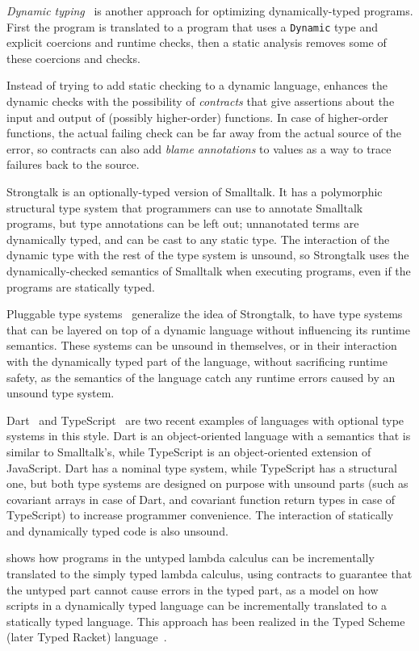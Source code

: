 \documentclass[preprint]{sig-alternate}
\begin{document}
\textit{Dynamic typing}~\citep{henglein1994dts} is
another approach for optimizing dynamically-typed programs.
First the program is translated to a program that uses
a {\tt Dynamic} type and explicit coercions and runtime checks,
then a static analysis removes some  of these coercions and
checks.

Instead of trying to add static checking to a dynamic
language, \citet{findler2002chf} enhances
the dynamic checks with the possibility of {\em contracts}
that give assertions about the input and output of (possibly
higher-order) functions. In case of higher-order functions,
the actual failing check can be far away from the actual
source of the error, so contracts can also add {\em blame
annotations} to values as a way to trace failures back to
the source.

Strongtalk \citep{bracha1993strongtalk,bracha1996strongtalk} is
an optionally-typed version of Smalltalk. It has a
polymorphic structural type system that programmers can use
to annotate Smalltalk programs, but type annotations can be
left out; unnanotated terms are dynamically typed, and can
be cast to any static type. The interaction of the dynamic
type with the rest of the type system is unsound, so
Strongtalk uses the dynamically-checked semantics of
Smalltalk when executing programs, even if the programs
are statically typed.

Pluggable type systems~\citep{bracha2004pluggable} generalize
the idea of Strongtalk, to have type systems that can be
layered on top of a dynamic language without influencing
its runtime semantics. These systems can be unsound in
themselves, or in their interaction with the dynamically
typed part of the language, without sacrificing runtime
safety, as the semantics of the language catch any
runtime errors caused by an unsound type system.

Dart~\citep{dart} and TypeScript~\citep{typescript} are
two recent examples of languages with optional type systems
in this style. Dart is an object-oriented language with
a semantics that is similar to Smalltalk's, while TypeScript
is an object-oriented extension of JavaScript. Dart has a
nominal type system, while TypeScript has a structural one,
but both type systems are designed on purpose with unsound
parts (such as covariant arrays in case of Dart, and
covariant function return types in case of TypeScript) to
increase programmer convenience. The interaction of
statically and dynamically typed code is also unsound.

\citep{tobin-hochstadt2006ims} shows how programs
in the untyped lambda calculus can be incrementally
translated to the simply typed lambda calculus, using
contracts to guarantee that the untyped part cannot
cause errors in the typed part, as a model on how
scripts in a dynamically typed language can be
incrementally translated to a statically typed
language. This approach has been realized in the
Typed Scheme (later Typed Racket) language~\citet{tobin-hochstadt2008ts}.
\end{document}
